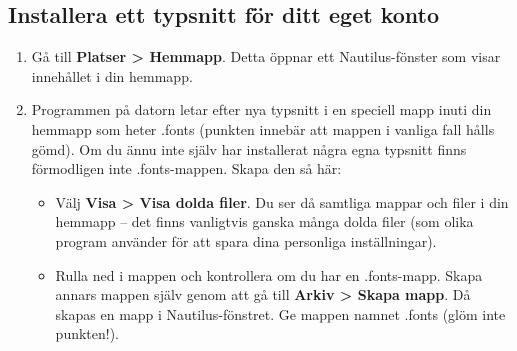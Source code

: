 \documentclass[a4paper,final]{memoir} %
\begin{document}


\subsection{Installera ett typsnitt för ditt eget konto}


\begin{enumerate}


\item Gå till \textbf{Platser \textgreater{} Hemmapp}. Detta öppnar ett Nautilus-fönster som visar innehållet i din hemmapp.


\item Programmen på datorn letar efter nya typsnitt i en speciell mapp inuti din hemmapp som heter .fonts (punkten innebär att mappen i vanliga fall hålls gömd). Om du ännu inte själv har installerat några egna typsnitt finns förmodligen inte .fonts-mappen. Skapa den så här:

\begin{itemize}

\item Välj \textbf{Visa \textgreater{} Visa dolda filer}. Du ser då samtliga mappar och filer i din hemmapp -- det finns vanligtvis ganska många dolda filer (som olika program använder för att spara dina personliga inställningar).

\item Rulla ned i mappen och kontrollera om du har en .fonts-mapp. Skapa annars mappen själv genom att gå till \textbf{Arkiv \textgreater{} Skapa mapp}. Då skapas en mapp i Nautilus-fönstret. Ge mappen namnet .fonts (glöm inte punkten!).

\end{itemize}




\end{enumerate}
\end{document}
